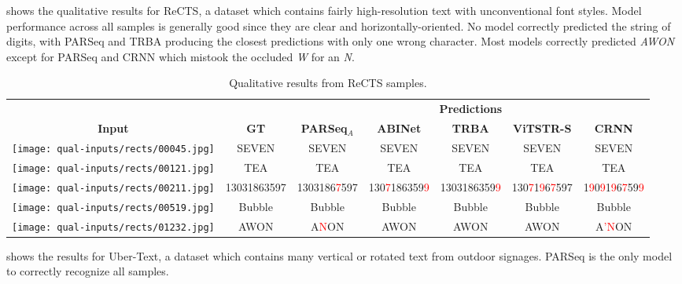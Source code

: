 shows the qualitative results for ReCTS, a dataset which contains fairly high-resolution text with unconventional font styles. Model performance across all samples is generally good since they are clear and horizontally-oriented. No model correctly predicted the string of digits, with PARSeq and TRBA producing the closest predictions with only one wrong character. Most models correctly predicted \textit{AWON} except for PARSeq and CRNN which mistook the occluded \textit{W} for an \textit{N}.

\begin{table*}[htb]
  \centering
  \scriptsize
  \setlength\tabcolsep{2pt}
  \caption{Qualitative results from ReCTS samples.}
  \begin{tabular}{ c c c c c c c }
    \toprule
    & & \multicolumn{5}{c}{\textbf{Predictions}} \\
    \cmidrule{3-7}
    \textbf{Input} & \textbf{GT} & \textbf{PARSeq$_A$} & \textbf{ABINet} & \textbf{TRBA} & \textbf{ViTSTR-S} & \textbf{CRNN} \\
    \midrule
    \texttt{[image: qual-inputs/rects/00045.jpg]} & SEVEN & SEVEN & SEVEN & SEVEN & SEVEN & SEVEN \\
    \texttt{[image: qual-inputs/rects/00121.jpg]} & TEA & TEA & TEA & TEA & TEA & TEA \\
    \texttt{[image: qual-inputs/rects/00211.jpg]} & {\scriptsize 13031863597} & {\scriptsize 1303186\textcolor{red}{7}597} & {\scriptsize 130\textcolor{red}{7}186359\textcolor{red}{9}} & {\scriptsize 1303186359\textcolor{red}{9}} & {\scriptsize 130\textcolor{red}{7}1\textcolor{red}{9}6\textcolor{red}{7}597} & {\scriptsize 1\textcolor{red}{9}0\textcolor{red}{9}1\textcolor{red}{9}6\textcolor{red}{7}59\textcolor{red}{9}} \\
    \texttt{[image: qual-inputs/rects/00519.jpg]} & Bubble & Bubble & Bubble & Bubble & Bubble & Bubble \\
    \texttt{[image: qual-inputs/rects/01232.jpg]} & AWON & A\textcolor{red}{N}ON & AWON & AWON & AWON & A\textcolor{red}{'N}ON \\
    \bottomrule
  \end{tabular}
  \label{tab:qual-results-rects}
\end{table*}

 shows the results for Uber-Text, a dataset which contains many vertical or rotated text from outdoor signages. PARSeq is the only model to correctly recognize all samples.




